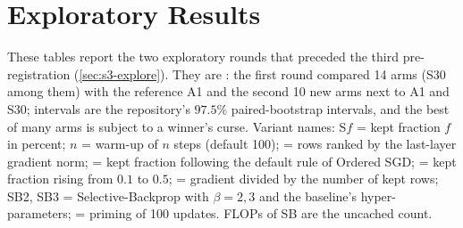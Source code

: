 \chapter{Exploratory Results}\label{app:exploratory}
These tables report the two exploratory rounds that preceded the third pre-registration (\cref{sec:s3-explore}). They are \tierE{}: the first round compared 14 arms (S30 among them) with the reference A1 and the second 10 new arms next to A1 and S30; intervals are the repository's $97.5\%$ paired-bootstrap intervals, and the best of many arms is subject to a winner's curse. Variant names: S$f$ = kept fraction $f$ in percent; $n$ = warm-up of $n$ steps (default 100);  = rows ranked by the last-layer gradient norm;  = kept fraction following the default rule of Ordered SGD;  = kept fraction rising from $0.1$ to $0.5$;  = gradient divided by the number of kept rows; SB2, SB3 = Selective-Backprop with $\beta=2,3$ and the baseline's hyper-parameters;  = priming of 100 updates. FLOPs of SB are the uncached count.

\begin{table}[h]
\centering\footnotesize
\caption{Headroom study (10 seeds, 2100--2109): paired change in FLOPs-to-target against S30 and against A1 (\%).}
\label{tab:headroom}
\end{table}

\begin{table}[h]
\centering\footnotesize
\caption{Look 2 (10 new seeds, 2110--2119): paired change in FLOPs-to-target against S30 and against A1 (\%).}
\label{tab:look2}
\end{table}

